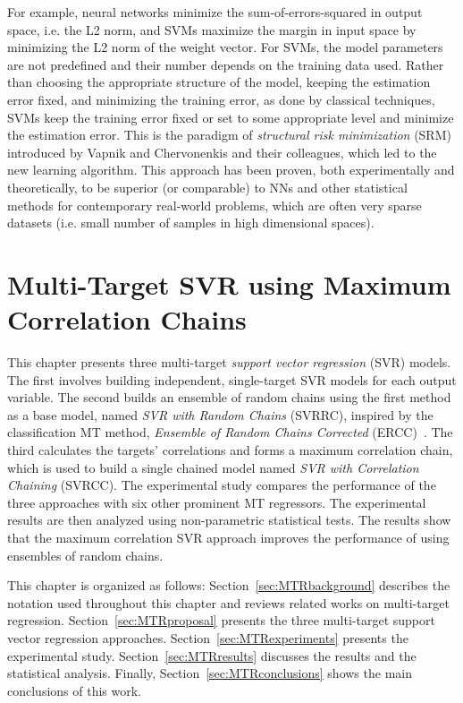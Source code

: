 \documentclass[reqno]{vcuthesis}
\numberwithin{equation}{chapter}
\begin{document}
For example, neural networks minimize the sum-of-errors-squared in output space, i.e. the L2 norm, and SVMs maximize the margin in input space by minimizing the L2 norm of the weight vector. For SVMs, the model parameters are not predefined and their number depends on the training data used. Rather than choosing the appropriate structure of the model, keeping the estimation error fixed, and minimizing the training error, as done by classical techniques, SVMs keep the training error fixed or set to some appropriate level and minimize the estimation error. This is the paradigm of \textit{structural risk minimization} (SRM) introduced by Vapnik and Chervonenkis and their colleagues, which led to the new learning algorithm. This approach has been proven, both experimentally and theoretically, to be superior (or comparable) to NNs and other statistical methods for contemporary real-world problems, which are often very sparse datasets (i.e. small number of samples in high dimensional spaces).

\chapter{Multi-Target SVR using Maximum Correlation Chains}\label{chap:mtr}
This chapter presents three multi-target \textit{support vector regression} (SVR) models. The first involves building independent, single-target SVR models for each output variable. The second builds an ensemble of random chains using the first method as a base model, named \textit{SVR with Random Chains} (SVRRC), inspired by the classification MT method, \textit{Ensemble of Random Chains Corrected} (ERCC)~\cite{Spyromitros2014}. The third calculates the targets' correlations and forms a maximum correlation chain, which is used to build a single chained model named \textit{SVR with Correlation Chaining} (SVRCC). The experimental study compares the performance of the three approaches with six other prominent MT regressors. The experimental results are then analyzed using non-parametric statistical tests. The results show that the maximum correlation SVR approach improves the performance of using ensembles of random chains. 

This chapter is organized as follows: Section~\ref{sec:MTRbackground} describes the notation used throughout this chapter and reviews related works on multi-target regression. Section~\ref{sec:MTRproposal} presents the three multi-target support vector regression approaches. Section~\ref{sec:MTRexperiments} presents the experimental study. Section~\ref{sec:MTRresults} discusses the results and the statistical analysis. Finally, Section~\ref{sec:MTRconclusions} shows the main conclusions of this work.
\end{document}
